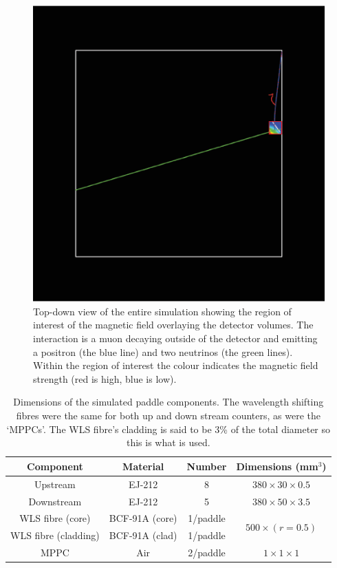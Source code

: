 \begin{figure}[hptb]
  \centering
    \includegraphics[width=.9\textwidth]{images/top_for_combo_with_field.eps}
  \caption{Top-down view of the entire simulation showing the region of interest of the magnetic field overlaying the detector volumes. The interaction is a muon decaying outside of the detector and emitting a positron (the blue line) and two neutrinos (the green lines). Within the region of interest the colour indicates the magnetic field strength (red is high, blue is low).}
  \label{fig:images_top_for_combo_with_field}
\end{figure}

\begin{table}
  \begin{center}
  \begin{tabular}{c | c | c | c}
    Component      & Material         & Number     &  Dimensions (mm\(^3\)) \\
    \hline
    Upstream              &  EJ-212          &  8         &  \(380\times30\times0.5 \) \\
    Downstream            &  EJ-212          &  5         &  \(380\times50\times3.5 \) \\
    WLS fibre (core)      &  BCF-91A (core)  &  1/paddle  &  
                                        \multirow{2}{*}{\(500\times(r=0.5)\)} \\
    WLS fibre (cladding)  &  BCF-91A (clad)  &  1/paddle  &  \\
    MPPC                  &  Air             &  2/paddle  &  \(1\times1\times1 \) \\
  \end{tabular}
  \end{center}
  \caption{Dimensions of the simulated paddle components. The wavelength shifting fibres were the same for both up and down stream counters, as were the `MPPCs'. The WLS fibre's cladding is said to be 3\% of the total diameter so this is what is used.}
  \label{tab:dimensions_of_paddles}
\end{table}

